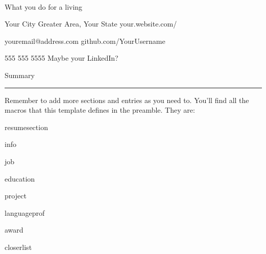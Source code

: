 \documentclass[12pt]{article}
\newcommand{\resumesection}[1]{
    {
        \color{accentcolor}
        \noindent
        \large{#1}
        \vspace{-8pt}

        \noindent
        \rule{\textwidth}{2pt}
    }
}
\newcommand{\info}[2]{
    {
        \color{secondarytext}
        \trivlist\nopagebreak
        \parindent0pt
        \item #1 \hspace{\fill} #2
        \item\relax\obeylines
    }
    \vspace{-5pt}
}
\newcommand{\closerlist}[1]{
    \raisebox{3pt}{$\centerdot$} #1

    \vspace{5pt}
}
\begin{document}
\begin{center}
     \\
    \vspace{0.25cm}
    \Large{What you do for a living}
\end{center}

\info{Your City Greater Area, Your State}{your.website.com/}
\info{youremail@address.com}{github.com/YourUsername}
\info{555 555 5555}{Maybe your LinkedIn?}
\vspace{15pt}

\resumesection{Summary}

\hangindent=15pt
Remember to add more sections and entries as you need to. You'll find all
the macros that this template defines in the preamble. They are:

\closerlist{resumesection}
\closerlist{info}
\closerlist{job}
\closerlist{education}
\closerlist{project}
\closerlist{languageprof}
\closerlist{award}
\closerlist{closerlist}

\vspace{15pt}
\end{document}
